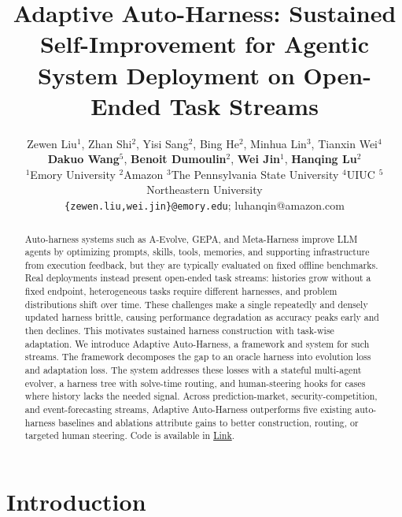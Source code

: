 \documentclass[11pt]{article}
\title{Adaptive Auto-Harness: Sustained Self-Improvement for Agentic System Deployment on Open-Ended Task Streams}
\author{Zewen Liu$^{1}$, Zhan Shi$^{2}$, Yisi Sang$^{2}$, Bing He$^{2}$, Minhua Lin$^{3}$, Tianxin Wei$^{4}$\\
\textbf{Dakuo Wang}$^{5}$, \textbf{Benoit Dumoulin}$^{2}$, \textbf{Wei Jin}$^{1}$, \textbf{Hanqing Lu}$^{2}$\\
$^{1}$Emory University $^{2}$Amazon $^{3}$The Pennsylvania State University $^{4}$UIUC $^{5}$Northeastern University \\
\texttt{\{zewen.liu,wei.jin\}@emory.edu}; 
{luhanqin@amazon.com}


}
\theoremstyle{plain}
\begin{document}
\maketitle

\begin{abstract}
Auto-harness systems such as A-Evolve, GEPA, and Meta-Harness improve LLM agents by optimizing prompts, skills, tools, memories, and supporting infrastructure from execution feedback, but they are typically evaluated on fixed offline benchmarks. Real deployments instead present open-ended task streams: histories grow without a fixed endpoint, heterogeneous tasks require different harnesses, and problem distributions shift over time. These challenges make a single repeatedly and densely updated harness brittle, causing performance degradation as accuracy peaks early and then declines. This motivates sustained harness construction with task-wise adaptation. We introduce Adaptive Auto-Harness, a framework and system for such streams. The framework decomposes the gap to an oracle harness into evolution loss and adaptation loss. The system addresses these losses with a stateful multi-agent evolver, a harness tree with solve-time routing, and human-steering hooks for cases where history lacks the needed signal. Across prediction-market, security-competition, and event-forecasting streams, Adaptive Auto-Harness outperforms five existing auto-harness baselines and ablations attribute gains to better construction, routing, or targeted human steering. Code is available in \href{https://github.com/A-EVO-Lab/a-evolve/tree/release/adaptive-auto-harness}{Link}.
\end{abstract}





































\section{Introduction}
\label{sec:intro}
\end{document}
